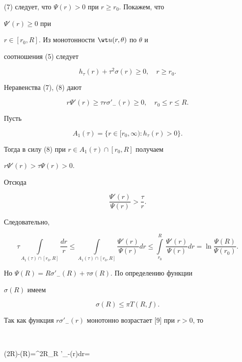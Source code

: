 (7) следует, что $\Psi(r)>0$ при $r\ge r_0$. Покажем, что 


$\Psi'(r)\ge0$ при 


$r\in[r_0,R]$. Из монотонности $\wt u(r,\theta)$ по $\theta$ и 


соотношения (5) следует 


$$ 


h_\tau(r)+\tau^2\sigma(r)\ge0,\quad r\ge r_0. 


$$ 


Неравенства (7), (8) дают 


$$ 


r\Psi'(r)\ge\tau r\sigma'_-(r)\ge0,\quad r_0\le r\le R. 


$$ 


Пусть 


$$ 


A_1(\tau)=\{r\in[r_0,\infty):h_\tau(r)>0\}. 


$$ 


Тогда в силу (8) при $r\in A_1(\tau)\cap[r_0,R]$ получаем 


$r \Psi'(r)>\tau\Psi(r)>0$. 


Отсюда 


$$ 


\frac{\Psi'(r)}{\Psi(r)}>\frac{\tau}{r}.


$$ 


Следовательно, 


\begin{equation} 


\tau\int\limits_{A_1(\tau)\cap[r_0,R]}\frac{dr}{r}\le 


\int\limits_{A_1(\tau)\cap[r_0,R]}\frac{\Psi'(r)}{\Psi(r)}dr\le 


\int\limits^R_{r_0}\,\frac{\Psi'(r)}{\Psi(r)}dr= 


\ln\frac{\Psi(R)}{\Psi(r_0)}. 


\end{equation} 


Но $\Psi(R)=R\sigma'_-(R)+\tau\sigma(R)$. По определению функции 


$\sigma(R)$ имеем 


$$ 


\sigma(R)\le\pi T(R,f). 


$$ 


Так как функция $r\sigma'_-(r)$ монотонно возрастает [9] при $r>0$, то 


$$ 


\sigma(2R)-\sigma(R)=\int^{2R}_R \sigma'_-(r)dr= 


